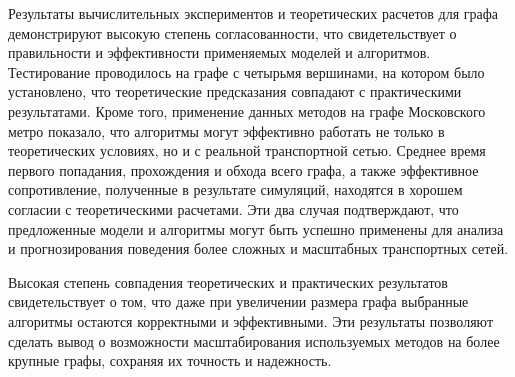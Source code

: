\Conclusion

Результаты вычислительных экспериментов и теоретических расчетов для графа демонстрируют высокую степень согласованности, что свидетельствует о правильности и эффективности применяемых моделей и алгоритмов. Тестирование проводилось на графе с четырьмя вершинами, на котором было установлено, что теоретические предсказания совпадают с практическими результатами. Кроме того, применение данных методов на графе Московского метро показало, что алгоритмы могут эффективно работать не только в теоретических условиях, но и с реальной транспортной сетью. Среднее время первого попадания, прохождения и обхода всего графа, а также эффективное сопротивление, полученные в результате симуляций, находятся в хорошем согласии с теоретическими расчетами. Эти два случая подтверждают, что предложенные модели и алгоритмы могут быть успешно применены для анализа и прогнозирования поведения более сложных и масштабных транспортных сетей.

Высокая степень совпадения теоретических и практических результатов свидетельствует о том, что даже при увеличении размера графа выбранные алгоритмы остаются корректными и эффективными. Эти результаты позволяют сделать вывод о возможности масштабирования используемых методов на более крупные графы, сохраняя их точность и надежность.
